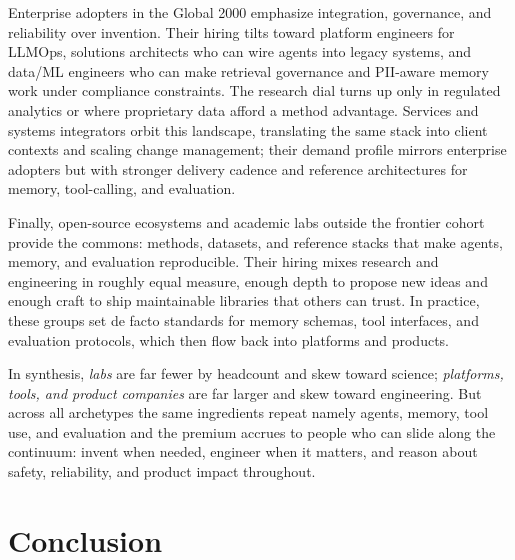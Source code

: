 \documentclass[pdflatex,sn-mathphys-num]{sn-jnl}%
\theoremstyle{thmstyleone}%
\theoremstyle{thmstyletwo}%
\theoremstyle{thmstylethree}%
\begin{document}
Enterprise adopters in the Global 2000 emphasize integration, governance, and reliability over invention. Their hiring tilts toward platform engineers for LLMOps, solutions architects who can wire agents into legacy systems, and data/ML engineers who can make retrieval governance and PII-aware memory work under compliance constraints. The research dial turns up only in regulated analytics or where proprietary data afford a method advantage. Services and systems integrators orbit this landscape, translating the same stack into client contexts and scaling change management; their demand profile mirrors enterprise adopters but with stronger delivery cadence and reference architectures for memory, tool-calling, and evaluation.

Finally, open-source ecosystems and academic labs outside the frontier cohort provide the commons: methods, datasets, and reference stacks that make agents, memory, and evaluation reproducible. Their hiring mixes research and engineering in roughly equal measure, enough depth to propose new ideas and enough craft to ship maintainable libraries that others can trust. In practice, these groups set de facto standards for memory schemas, tool interfaces, and evaluation protocols, which then flow back into platforms and products.

In synthesis, \emph{labs} are far fewer by headcount and skew toward science; \emph{platforms, tools, and product companies} are far larger and skew toward engineering. But across all archetypes the same ingredients repeat namely agents, memory, tool use, and evaluation and the premium accrues to people who can slide along the continuum: invent when needed, engineer when it matters, and reason about safety, reliability, and product impact throughout.


\section{Conclusion}
\end{document}
